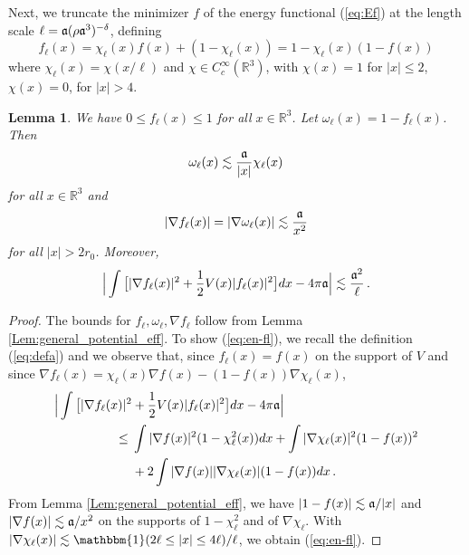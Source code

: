 \documentclass[a4paper,11pt]{article}
\def\bR{\mathbb{R}}
\newtheorem{lemma}[theorem]{Lemma}
\numberwithin{equation}{section}
\begin{document}
Next, we truncate the minimizer $f$ of the energy functional (\ref{eq:Ef}) at the length scale $\ell = \frak{a} (\rho \frak{a}^3)^{-\delta}$, defining 
\begin{equation}\label{eq:fell} f_\ell (x) = \chi_\ell (x) f(x) + (1- \chi_\ell (x)) = 1- \chi_\ell (x) (1 -f(x)) \end{equation}
where $\chi_\ell (x) = \chi (x/\ell)$ and $\chi \in C^\infty_c (\bR^3)$, with $\chi (x) = 1$ for $|x| \leq 2$, $\chi (x) = 0$, for $|x| > 4$. 
\begin{lemma}  \label{lm:omega}
We have $0\leq f_\ell (x) \leq 1$ for all $x \in \bR^3$. Let $\omega_\ell (x) = 1- f_\ell (x)$. Then 
\[ \omega_\ell (x) \lesssim \frac{\frak{a}}{|x|} \chi_\ell (x) \]
for all $x \in \bR^3$ and 
\[ |\nabla f_\ell (x)| = |\nabla \omega_\ell (x)| \lesssim \frac{\frak{a}}{x^2} \]
for all $|x| > 2 r_0$. Moreover, 
\begin{equation}\label{eq:en-fl} \Big| \int \big[ |\nabla f_\ell (x)|^2 + \frac{1}{2} V (x) |f_\ell (x)|^2 \big] dx - 4 \pi \frak{a} \Big| \lesssim \frac{\frak{a}^2}{\ell} \,.\end{equation}
\end{lemma} 
\begin{proof}
The bounds for $f_\ell, \omega_\ell, \nabla f_\ell$ follow from Lemma \ref{Lem:general_potential_eff}. To show (\ref{eq:en-fl}), we recall the definition (\ref{eq:defa}) and we observe that, since $f_\ell (x) = f(x)$ on the support of $V$ and since $\nabla f_\ell (x) = \chi_\ell (x)\nabla f (x)  - (1-f(x)) \nabla \chi_\ell (x)$, 
\[ \begin{split} \Big| \int  \big[ |\nabla f_\ell (x)|^2 &+ \frac{1}{2} V (x) | f_\ell (x)|^2\big] dx  - 4\pi \frak{a} \Big| \\ \leq \; &\int |\nabla f (x)|^2 (1- \chi_\ell^2 (x)) dx + \int |\nabla \chi_\ell (x)|^2 (1- f(x))^2 \\ &+2 \int |\nabla f (x)| |\nabla \chi_\ell (x)| (1- f(x)) dx \,. \end{split} \]
From Lemma \ref{Lem:general_potential_eff}, we have $|1-f(x)| \lesssim \frak{a}/|x|$ and $|\nabla f (x)| \lesssim \frak{a}/x^2$ on the supports of $1-\chi_\ell^2$ and of $\nabla \chi_\ell$. With $|\nabla \chi_\ell (x)| \lesssim \mathbbm{1} (2\ell \leq |x| \leq 4\ell) / \ell$, we obtain (\ref{eq:en-fl}). 
\end{proof}
\end{document}

